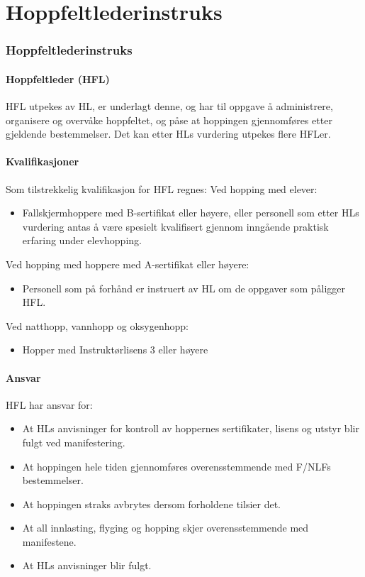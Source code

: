\part{Hoppfeltlederinstruks}
\setcounter{section}{506}

\section{Hoppfeltlederinstruks}
\subsection{Hoppfeltleder (HFL)}
HFL utpekes av HL, er underlagt denne, og har til oppgave å administrere, organisere og overvåke hoppfeltet, og påse at hoppingen gjennomføres etter gjeldende bestemmelser. Det kan etter HLs vurdering utpekes flere HFLer.

\subsection{Kvalifikasjoner}
Som tilstrekkelig kvalifikasjon for HFL regnes: Ved hopping med elever:
\begin{itemize}
	\item Fallskjermhoppere med B-sertifikat eller høyere, eller personell som etter HLs vurdering antas å være spesielt kvalifisert gjennom inngående praktisk erfaring under elevhopping.
\end{itemize}

Ved hopping med hoppere med A-sertifikat eller høyere:
\begin{itemize}
	\item Personell som på forhånd er instruert av HL om de oppgaver som påligger HFL.
\end{itemize}

Ved natthopp, vannhopp og oksygenhopp:
\begin{itemize}
	\item Hopper med Instruktørlisens 3 eller høyere
\end{itemize}

\subsection{Ansvar}
HFL har ansvar for:
\begin{itemize}
	\item At HLs anvisninger for kontroll av hoppernes sertifikater, lisens og utstyr blir fulgt ved manifestering.
	\item At hoppingen hele tiden gjennomføres overensstemmende med F/NLFs bestemmelser.
	\item At hoppingen straks avbrytes dersom forholdene tilsier det.
	\item At all innlasting, flyging og hopping skjer overensstemmende med manifestene.
	\item At HLs anvisninger blir fulgt.
\end{itemize}

